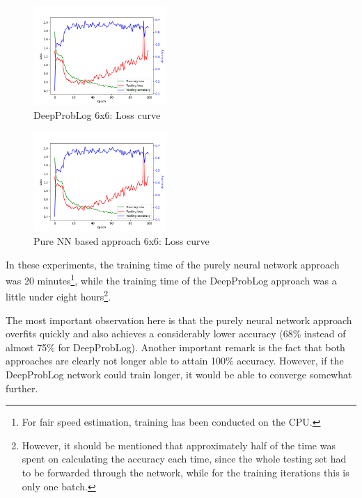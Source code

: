 \documentclass[english]{sobraep}
\begin{document}
\begin{figure}[htp]
    \begin{center}
    \includegraphics[width=0.45\textwidth]{loss_curve_deepproblog_6x6.png} 
    \captionsetup{justification=centering}
    \caption{DeepProbLog 6x6: Loss curve}
    \label{fig:loss_curve_deepproblog_6x6}
    \end{center}
\end{figure}

\begin{figure}[htp]
    \begin{center}
    \includegraphics[width=0.45\textwidth]{loss_curve_pure_NN_6x6.png} 
    \captionsetup{justification=centering}
    \caption{Pure NN based approach 6x6: Loss curve}
    \label{fig:loss_curve_pure_NN_6x6}
    \end{center}
\end{figure}

In these experiments, the training time of the purely neural network approach was 20 minutes\footnote{For fair speed estimation, training has been conducted on the CPU.}, while the training time of the DeepProbLog approach was a little under eight hours\footnote{However, it should be mentioned that approximately half of the time was spent on calculating the accuracy each time, since the whole testing set had to be forwarded through the network, while for the training iterations this is only one batch.}.

The most important observation here is that the purely neural network approach overfits quickly and also achieves a considerably lower accuracy (68\% instead of almost 75\% for DeepProbLog). Another important remark is the fact that both approaches are clearly not longer able to attain 100\% accuracy. However, if the DeepProbLog network could train longer, it would be able to converge somewhat further.
\end{document}
